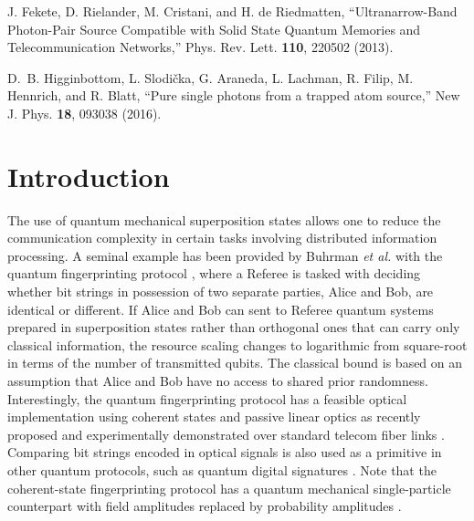 \documentclass[10pt]{article}
\begin{document}
\begin{thebibliography}{99}
 J. Fekete, D. Rielander, M. Cristani, and H. de Riedmatten, ``Ultranarrow-Band Photon-Pair Source Compatible with Solid State Quantum Memories and Telecommunication Networks,'' Phys. Rev. Lett. {\bf 110}, 220502 (2013).

 D.~B. Higginbottom, L. Slodi\v{c}ka, G. Araneda, L. Lachman, R. Filip, M. Hennrich, and R. Blatt, ``Pure single photons from a trapped atom source,'' New J. Phys. {\bf 18}, 093038 (2016).

\end{thebibliography}

\section{Introduction}

The use of quantum mechanical superposition states allows one to
reduce the communication complexity in certain tasks involving
distributed information processing. A seminal example has been provided
by Buhrman {\em et al.} with the quantum fingerprinting protocol \cite{Buhrman2001}, where a
Referee is tasked with deciding whether bit strings in possession of two
separate parties, Alice and Bob, are identical or different.
If Alice and Bob can sent to Referee quantum systems prepared in
superposition states rather than orthogonal ones that can carry
only classical information, the resource scaling changes to
logarithmic from square-root in terms of the number of transmitted qubits. The classical bound is based on an assumption that Alice and Bob have no access to shared prior randomness.
Interestingly, the quantum fingerprinting protocol has a feasible
optical implementation using coherent states and passive linear optics as recently
proposed \cite{Luthenhaus2014,Kumar} and experimentally demonstrated over standard telecom fiber links \cite{Xu,Guan}. Comparing bit strings encoded in optical signals is also used as a primitive in other quantum protocols, such as quantum digital signatures \cite{Clarke,Collins}.
Note that the coherent-state fingerprinting protocol has a quantum mechanical single-particle counterpart with field amplitudes replaced by probability amplitudes \cite{Massar}.
\end{document}

